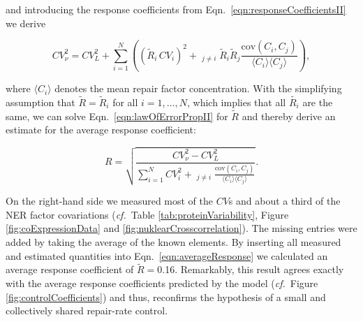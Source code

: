 and introducing the response coefficients from Eqn.\ \ref{eqn:responseCoefficientsII} we derive

\begin{equation}
	CV_{\nu}^2 = CV_{L}^2 + \sum_{i=1}^{N} \left((\tilde{R}_i\,CV_i)^2 + \mathop{\sum_{j = 1}^{N}}_{j\neq i} \tilde{R}_i\tilde{R}_j \frac{\textrm{cov}(C_i,C_j)}{\langle C_i \rangle\langle C_j\rangle}\right),
	\label{eqn:lawOfErrorPropII}
\end{equation}

where $\langle C_i \rangle$ denotes the mean repair factor concentration. With the simplifying assumption that $\tilde{R} = \tilde{R}_i$ for all $i = 1,\ldots,N$, which implies that all $\tilde{R_i}$ are the same, we can solve Eqn.\ \ref{eqn:lawOfErrorPropII} for $\tilde{R}$ and thereby derive an estimate for the average response coefficient:

\begin{equation}
	R = \sqrt{	\frac{CV_{\nu}^2 - CV_L^2}{\sum_{i=1}^{N} CV_i^2 + \mathop{\sum_{j=1}^{N}}_{j \neq i} \frac{\textrm{cov}(C_i,C_j)}{\langle C_i \rangle\langle C_j\rangle}}}.
	\label{eqn:averageResponse}
\end{equation} 


On the right-hand side we measured most of the $CV$s and about a third of the NER factor covariations (\textit{cf.}\ Table \ref{tab:proteinVariability}, Figure \ref{fig:coExpressionData} and \ref{fig:nuklearCrosscorrelation}). The missing entries were added by taking the average of the known elements. By inserting all measured and estimated quantities into Eqn.\ \ref{eqn:averageResponse} we calculated an average response coefficient of $\tilde{R} =$0.16. Remarkably, this result agrees exactly with the average response coefficients predicted by the model (\textit{cf.}\ Figure \ref{fig:controlCoefficients}) and thus, reconfirms the hypothesis of a small and collectively shared repair-rate control.     





